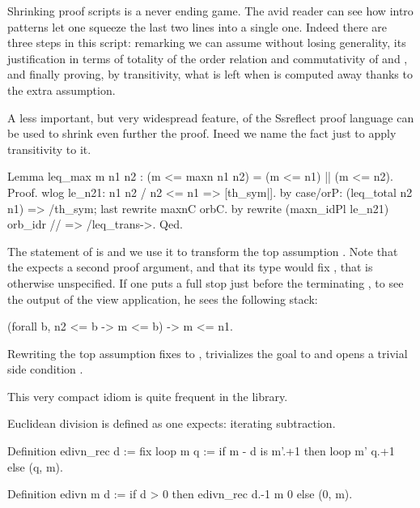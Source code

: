 Shrinking proof scripts is a never ending game.  The avid reader can
see how intro patterns let one squeeze the last two lines into a single
one.  Indeed there are three steps in this script: remarking we can
assume  without losing generality, its justification in
terms of totality of the order relation and commutativity of 
and \C{||}, and finally proving, by transitivity, what is left
when  is computed away thanks to the extra  assumption.


A less important, but very widespread feature, of the Ssreflect
proof language can be used to shrink even further the proof.
Ineed we name the fact  just to apply transitivity to it.

\begin{coq}{}{}
Lemma leq_max m n1 n2 : (m <= maxn n1 n2) = (m <= n1) || (m <= n2).
Proof.
wlog le_n21: n1 n2 / n2 <= n1 => [th_sym|].
  by case/orP: (leq_total n2 n1) => /th_sym; last rewrite maxnC orbC.
by rewrite (maxn_idPl le_n21) orb_idr // => /leq_trans->.
Qed.
\end{coq}

The statement of
 is  and
we use it to transform the top assumption .  Note that
the  expects a second proof argument, and that its type
would fix , that is otherwise unspecified.  If one puts a
full stop just before the terminating \C{->}, to see the output of
the view application, he sees the following stack:

\begin{coq}{}{}
(forall b, n2 <= b -> m <= b) -> m <= n1.
\end{coq}

Rewriting the top assumption fixes  to , trivializes 
the goal  to  and opens a trivial side
condition .

This very compact idiom  is quite frequent in the
\mcbMC{} library.


Euclidean division is defined as one expects: iterating subtraction.

\begin{coq}{}{}
Definition edivn_rec d := 
  fix loop m q := if m - d is m'.+1 then loop m' q.+1 else (q, m).

Definition edivn m d := if d > 0 then edivn_rec d.-1 m 0 else (0, m).
\end{coq}

